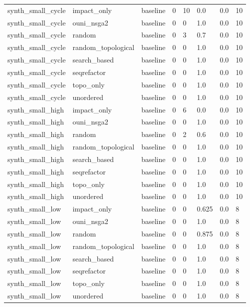 \begin{table}[t]
\begin{tabular}{llllllll}
synth\_small\_cycle & impact\_only & baseline & 0 & 10 & 0.0 & 0.0 & 10 \\
synth\_small\_cycle & ouni\_nsga2 & baseline & 0 & 0 & 1.0 & 0.0 & 10 \\
synth\_small\_cycle & random & baseline & 0 & 3 & 0.7 & 0.0 & 10 \\
synth\_small\_cycle & random\_topological & baseline & 0 & 0 & 1.0 & 0.0 & 10 \\
synth\_small\_cycle & search\_based & baseline & 0 & 0 & 1.0 & 0.0 & 10 \\
synth\_small\_cycle & seqrefactor & baseline & 0 & 0 & 1.0 & 0.0 & 10 \\
synth\_small\_cycle & topo\_only & baseline & 0 & 0 & 1.0 & 0.0 & 10 \\
synth\_small\_cycle & unordered & baseline & 0 & 0 & 1.0 & 0.0 & 10 \\
synth\_small\_high & impact\_only & baseline & 0 & 6 & 0.0 & 0.0 & 10 \\
synth\_small\_high & ouni\_nsga2 & baseline & 0 & 0 & 1.0 & 0.0 & 10 \\
synth\_small\_high & random & baseline & 0 & 2 & 0.6 & 0.0 & 10 \\
synth\_small\_high & random\_topological & baseline & 0 & 0 & 1.0 & 0.0 & 10 \\
synth\_small\_high & search\_based & baseline & 0 & 0 & 1.0 & 0.0 & 10 \\
synth\_small\_high & seqrefactor & baseline & 0 & 0 & 1.0 & 0.0 & 10 \\
synth\_small\_high & topo\_only & baseline & 0 & 0 & 1.0 & 0.0 & 10 \\
synth\_small\_high & unordered & baseline & 0 & 0 & 1.0 & 0.0 & 10 \\
synth\_small\_low & impact\_only & baseline & 0 & 0 & 0.625 & 0.0 & 8 \\
synth\_small\_low & ouni\_nsga2 & baseline & 0 & 0 & 1.0 & 0.0 & 8 \\
synth\_small\_low & random & baseline & 0 & 0 & 0.875 & 0.0 & 8 \\
synth\_small\_low & random\_topological & baseline & 0 & 0 & 1.0 & 0.0 & 8 \\
synth\_small\_low & search\_based & baseline & 0 & 0 & 1.0 & 0.0 & 8 \\
synth\_small\_low & seqrefactor & baseline & 0 & 0 & 1.0 & 0.0 & 8 \\
synth\_small\_low & topo\_only & baseline & 0 & 0 & 1.0 & 0.0 & 8 \\
synth\_small\_low & unordered & baseline & 0 & 0 & 1.0 & 0.0 & 8 \\

\end{tabular}
\end{table}
